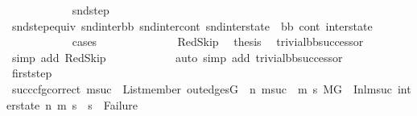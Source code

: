 \begin{isabellebody}
\isanewline
\ \ \ \ \ \ \ \ \ \ \isamarkupfalse%
\ snd{\isacharunderscore}{\kern0pt}step\ \isamarkupfalse%
\ snd{\isacharunderscore}{\kern0pt}step{\isacharunderscore}{\kern0pt}equiv{\isacharcolon}{\kern0pt}\ {\isachardoublequoteopen}{\isacharparenleft}{\kern0pt}snd{\isacharunderscore}{\kern0pt}inter{\isacharunderscore}{\kern0pt}bb{\isacharcomma}{\kern0pt}\ snd{\isacharunderscore}{\kern0pt}inter{\isacharunderscore}{\kern0pt}cont{\isacharcomma}{\kern0pt}\ snd{\isacharunderscore}{\kern0pt}inter{\isacharunderscore}{\kern0pt}state{\isacharparenright}{\kern0pt}\ {\isacharequal}{\kern0pt}\ {\isacharparenleft}{\kern0pt}bb{}{\isacharcomma}{\kern0pt}\ cont{}{\isacharcomma}{\kern0pt}\ inter{\isacharunderscore}{\kern0pt}state{\isacharparenright}{\kern0pt}{\isachardoublequoteclose}\isanewline
\ \ \ \ \ \ \ \ \ \ \isamarkupfalse%
\ cases\isanewline
\ \ \ \ \ \ \ \ \ \ \ \ \isamarkupfalse%
\ RedSkip\ \isamarkupfalse%
\ {\isacharquery}{\kern0pt}thesis\ \isamarkupfalse%
\ trivial{\isacharunderscore}{\kern0pt}bb{\isacharunderscore}{\kern0pt}successor\ \isamarkupfalse%
\ {\isacharparenleft}{\kern0pt}simp\ add{\isacharcolon}{\kern0pt}\ RedSkip{\isacharparenright}{\kern0pt}\isanewline
\ \ \ \ \ \ \ \ \ \ \isamarkupfalse%
\ {\isacharparenleft}{\kern0pt}auto\ simp\ add{\isacharcolon}{\kern0pt}\ trivial{\isacharunderscore}{\kern0pt}bb{\isacharunderscore}{\kern0pt}successor\ {\isachardoublequoteopen}{}{\isachardoublequoteclose}{\isacharparenright}{\kern0pt}\isanewline
\isanewline
\ \ \ \ \ \ \ \ \ \ \isamarkupfalse%
\ first{\isacharunderscore}{\kern0pt}step\ \isanewline
\ \ \ \ \ \ \ \ \ \ \isamarkupfalse%
\ succ{\isacharunderscore}{\kern0pt}cfg{\isacharunderscore}{\kern0pt}correct{\isacharcolon}{\kern0pt}\ {\isachardoublequoteopen}{\isacharparenleft}{\kern0pt}{\isasymforall}msuc{}{\isachardot}{\kern0pt}\ \ List{\isachardot}{\kern0pt}member\ {\isacharparenleft}{\kern0pt}out{\isacharunderscore}{\kern0pt}edges{\isacharparenleft}{\kern0pt}G{\isacharparenright}{\kern0pt}\ {\isacharbang}{\kern0pt}\ n{\isacharparenright}{\kern0pt}\ msuc{}\ {\isasymlongrightarrow}\ {\isacharparenleft}{\kern0pt}{\isasymforall}m{}\ s{}{\isachardot}{\kern0pt}\ {\isacharparenleft}{\kern0pt}{\isacharparenleft}{\kern0pt}M{\isacharcomma}{\kern0pt}{\isasymLambda}{\isacharcomma}{\kern0pt}{\isasymGamma}{\isacharcomma}{\kern0pt}{\isasymOmega}{\isacharcomma}{\kern0pt}G\ {\isasymturnstile}\ {\isacharparenleft}{\kern0pt}Inl{\isacharparenleft}{\kern0pt}msuc{}{\isacharparenright}{\kern0pt}{\isacharcomma}{\kern0pt}\ inter{\isacharunderscore}{\kern0pt}state{\isacharparenright}{\kern0pt}\ {\isacharminus}{\kern0pt}n{\isasymrightarrow}{\isacharasterisk}{\kern0pt}\ {\isacharparenleft}{\kern0pt}m{}{\isacharcomma}{\kern0pt}\ s{}{\isacharparenright}{\kern0pt}{\isacharparenright}{\kern0pt}\ {\isasymlongrightarrow}\ s{}\ {\isasymnoteq}\ Failure{\isacharparenright}{\kern0pt}{\isacharparenright}{\kern0pt}{\isacharparenright}{\kern0pt}{\isachardoublequoteclose}\isanewline

\end{isabellebody}
